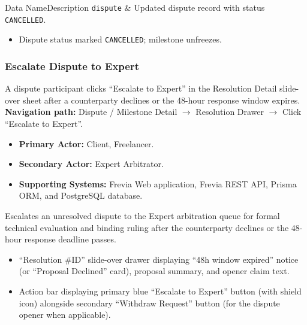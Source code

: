 \begin{specdatatable}{Data Name}{Description}
      \texttt{dispute} & Updated dispute record with status \texttt{CANCELLED}.\\ \hline
\end{specdatatable}

\begin{itemize}[leftmargin=1.6em,topsep=3pt,itemsep=2pt,parsep=0pt,label=$\bullet$]
      \item Dispute status marked \texttt{CANCELLED}; milestone unfreezes.
\end{itemize}

\subsubsection{ Escalate Dispute to Expert}

A dispute participant clicks ``Escalate to Expert'' in the Resolution Detail slide-over sheet after a counterparty declines or the 48-hour response window expires.\newline
\textbf{Navigation path:} Dispute / Milestone Detail $\rightarrow$ Resolution Drawer $\rightarrow$ Click ``Escalate to Expert''.


\begin{itemize}[leftmargin=1.6em,topsep=3pt,itemsep=2pt,parsep=0pt,label=$\bullet$]
      \item \textbf{Primary Actor:} Client, Freelancer.
      \item \textbf{Secondary Actor:} Expert Arbitrator.
      \item \textbf{Supporting Systems:} Frevia Web application, Frevia REST API, Prisma ORM, and PostgreSQL database.
\end{itemize}

\noindent Escalates an unresolved dispute to the Expert arbitration queue for formal technical evaluation and binding ruling after the counterparty declines or the 48-hour response deadline passes.

\begin{itemize}[leftmargin=1.6em,topsep=3pt,itemsep=2pt,parsep=0pt,label=$\bullet$]
      \item ``Resolution \#ID'' slide-over drawer displaying ``48h window expired'' notice (or ``Proposal Declined'' card), proposal summary, and opener claim text.
      \item Action bar displaying primary blue ``Escalate to Expert'' button (with shield icon) alongside secondary ``Withdraw Request'' button (for the dispute opener when applicable).
\end{itemize}

